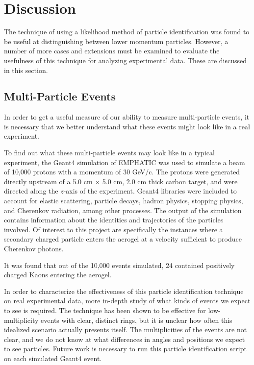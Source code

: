 
\chapter{Discussion}
\label{ch:Discussion}

The technique of using a likelihood method of  particle identification was found to be useful at distinguishing between lower momentum particles. However, a number of more cases and extensions must be examined to evaluate the usefulness of this technique for analyzing experimental data. 
These are discussed in this section. 


\section{Multi-Particle Events}
 In order to get a useful measure of our ability to measure multi-particle events, it is necessary that we better understand what these events might look like in a real experiment.

To find out what these multi-particle events may look like in a typical experiment, the Geant4 simulation of EMPHATIC was used to simulate a beam of 10,000 protons with a momentum of 30 GeV/c.
The protons were generated directly upstream of a 5.0 cm $\times$ 5.0 cm, 2.0 cm thick carbon target, and were directed along the $z$-axis of the experiment.
Geant4 libraries were included to account for elastic scattering, particle decays, hadron physics, stopping physics, and Cherenkov radiation, among other processes. 
The output of the simulation contains information about the identities and trajectories of the particles involved. 
Of interest to this project are specifically the instances where a secondary charged particle enters the aerogel at a velocity sufficient to produce Cherenkov photons.


It was found that out of the 10,000 events simulated, 24 contained positively charged Kaons entering the aerogel.


In order to characterize the effectiveness of this particle identification technique on real experimental data,  more in-depth study of what kinds of events we expect to see is required. 
The technique has been shown to be effective for low-multiplicity events with clear, distinct rings, but it is unclear how often this idealized scenario actually presents itself.
The multiplicities of the events are not clear, and we do not know at what differences in angles and positions we expect to see particles.
Future work is necessary to run this particle identification script on each simulated Geant4 event.

